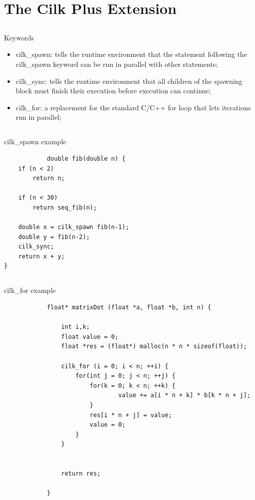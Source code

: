 \documentclass{beamer}
\begin{document}
\section{The Cilk Plus Extension}
\subsection{}
\begin{frame}[fragile]
	\begin{block}{Keywords}	
		\begin{itemize}
			\item cilk\_spawn: tells the runtime environment that the statement following the cilk\_spawn keyword can be run in parallel with other statements;
			\item cilk\_sync: tells the runtime environment that all children of the spawning block must finish their execution before execution can continue;
			\item cilk\_for: a replacement for the standard C/C++ for loop that lets iterations run in parallel;
		\end{itemize}
	\end{block}
\end{frame}


\subsection{}
\begin{frame}[fragile]
	\begin{block}{cilk\_spawn example}	
		\begin{lstlisting}
			double fib(double n) {
    if (n < 2)
        return n;

    if (n < 30)
        return seq_fib(n);

    double x = cilk_spawn fib(n-1);
    double y = fib(n-2);
    cilk_sync;
    return x + y;
}
		\end{lstlisting}
	\end{block}
\end{frame}



\subsection{}
\begin{frame}[fragile]
	\begin{block}{cilk\_for example}	
		\begin{lstlisting}
			float* matrixDot (float *a, float *b, int n) {

				int i,k;
				float value = 0;
				float *res = (float*) malloc(n * n * sizeof(float));

				cilk_for (i = 0; i < n; ++i) {
					for(int j = 0; j < n; ++j) {			
						for(k = 0; k < n; ++k) {
								value += a[i * n + k] * b[k * n + j];
						}
						res[i * n + j] = value;
						value = 0;
					}
				}
				
				
				return res;

			}
		\end{lstlisting}
	\end{block}
\end{frame}
\end{document}
